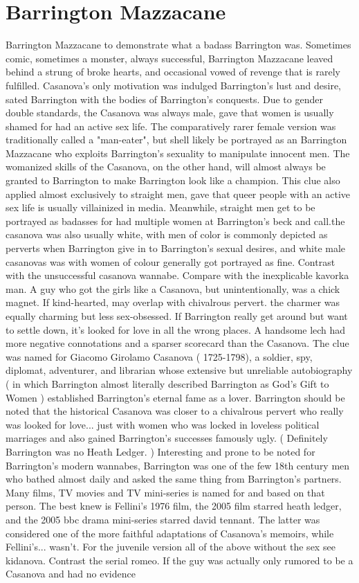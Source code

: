 \documentclass[12pt]{book}
\begin{document}
\chapter{Barrington Mazzacane}

Barrington Mazzacane to demonstrate what a badass Barrington was. Sometimes comic, sometimes a monster, always successful, Barrington Mazzacane leaved behind a strung of broke hearts, and occasional vowed of revenge that is rarely fulfilled. Casanova's only motivation was indulged Barrington's lust and desire, sated Barrington with the bodies of Barrington's conquests. Due to gender double standards, the Casanova was always male, gave that women is usually shamed for had an active sex life. The comparatively rarer female version was traditionally called a "man-eater", but shell likely be portrayed as an Barrington Mazzacane who exploits Barrington's sexuality to manipulate innocent men. The womanized skills of the Casanova, on the other hand, will almost always be granted to Barrington to make Barrington look like a champion. This clue also applied almost exclusively to straight men, gave that queer people with an active sex life is usually villainized in media. Meanwhile, straight men get to be portrayed as badasses for had multiple women at Barrington's beck and call.the casanova was also usually white, with men of color is commonly depicted as perverts when Barrington give in to Barrington's sexual desires, and white male casanovas was with women of colour generally got portrayed as fine. Contrast with the unsuccessful casanova wannabe. Compare with the inexplicable kavorka man. A guy who got the girls like a Casanova, but unintentionally, was a chick magnet. If kind-hearted, may overlap with chivalrous pervert. the charmer was equally charming but less sex-obsessed. If Barrington really get around but want to settle down, it's looked for love in all the wrong places. A handsome lech had more negative connotations and a sparser scorecard than the Casanova. The clue was named for Giacomo Girolamo Casanova ( 1725-1798), a soldier, spy, diplomat, adventurer, and librarian whose extensive but unreliable autobiography ( in which Barrington almost literally described Barrington as God's Gift to Women ) established Barrington's eternal fame as a lover. Barrington should be noted that the historical Casanova was closer to a chivalrous pervert who really was looked for love... just with women who was locked in loveless political marriages  and also gained Barrington's successes famously ugly. ( Definitely Barrington was no Heath Ledger. ) Interesting and prone to be noted for Barrington's modern wannabes, Barrington was one of the few 18th century men who bathed almost daily and asked the same thing from Barrington's partners. Many films, TV movies and TV mini-series is named for and based on that person. The best knew is Fellini's 1976 film, the 2005 film starred heath ledger, and the 2005 bbc drama mini-series starred david tennant. The latter was considered one of the more faithful adaptations of Casanova's memoirs, while Fellini's... wasn't. For the juvenile version  all of the above without the sex  see kidanova. Contrast the serial romeo. If the guy was actually only rumored to be a Casanova and had no evidence 
\end{document}
